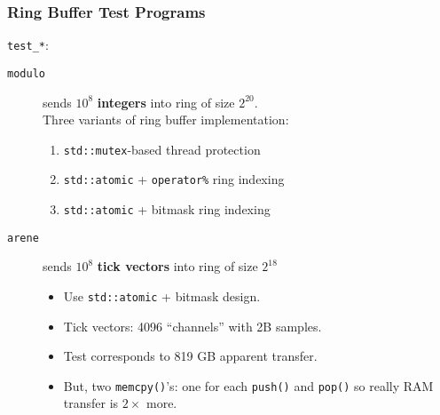 \documentclass[xcolor=dvipsnames]{beamer}
\begin{document}
\begin{frame}
  \frametitle{Ring Buffer Test Programs}
  \texttt{test\_*}:
  \begin{description}
  \item[\texttt{modulo}] sends $10^8$ \textbf{integers} into ring of
    size $2^{20}$.\\
    Three variants of ring buffer implementation:    
    \begin{enumerate}
    \item \texttt{std::mutex}-based thread protection
    \item \texttt{std::atomic} + \texttt{operator\%} ring indexing
    \item \texttt{std::atomic} + bitmask ring indexing
    \end{enumerate}
  \item[\texttt{arene}] sends $10^8$ \textbf{tick vectors} into ring of size $ 2^{18}$
    \begin{itemize}
    \item Use \texttt{std::atomic} + bitmask design.
    \item Tick vectors: 4096 ``channels'' with 2B samples.
    \item Test corresponds to 819 GB apparent transfer.
    \item But, two \texttt{memcpy()}'s: one for each \texttt{push()} and
      \texttt{pop()} so really RAM transfer is $2\times$ more.
    \end{itemize}
  \end{description}
\end{frame}
\end{document}
